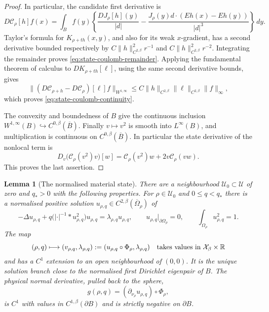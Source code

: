 \documentclass[11pt,a4paper]{article}
\newtheorem{lemma}[theorem]{Lemma}
\theoremstyle{definition}
\theoremstyle{remark}
\begin{document}
\begin{proof}
In particular, the candidate first derivative is
\begin{equation}
 D\mathcal C_\rho[h]f(x)
  =\int_B f(y)\left\{
       \frac{DJ_\rho[h](y)}{|d|}
       -\frac{J_\rho(y)d\cdot(Eh(x)-Eh(y))}{|d|^3}
                    \right\}\,dy.
 \label{eq:state-coulomb-derivative}
\end{equation}
Taylor's formula for $K_{\rho+th}(x,y)$, and also for its weak
$x$-gradient, has a second derivative bounded respectively by
$C\|h\|_{C^{2,\beta}}^2r^{-1}$ and
$C\|h\|_{C^{2,\beta}}^2r^{-2}$.  Integrating the remainder proves
\eqref{eq:state-coulomb-remainder}.  Applying the fundamental theorem
of calculus to $DK_{\rho+th}[\ell]$, using the same second derivative
bounds, gives
\[
 \|(D\mathcal C_{\rho+h}-D\mathcal C_\rho)[\ell]f\|_{W^{1,\infty}}
 \leq C\|h\|_{C^{2,\beta}}\|\ell\|_{C^{2,\beta}}\|f\|_\infty,
\]
which proves \eqref{eq:state-coulomb-continuity}.

The convexity and boundedness of $B$ give the continuous inclusion
$W^{1,\infty}(B)\hookrightarrow C^{0,\beta}(\overline B)$.
Finally $v\mapsto v^2$ is smooth into $L^\infty(B)$, and multiplication
is continuous on $C^{0,\beta}(\overline B)$.  In particular the state
derivative of the nonlocal term is
\[
 D_v\big(\mathcal C_\rho(v^2)v\big)[w]
       =\mathcal C_\rho(v^2)w+2v\mathcal C_\rho(vw).
\]
This proves the last assertion.
\end{proof}

\begin{lemma}[The normalised material state]
\label{lem:state}
There are a neighbourhood $\mathcal U_0\subset\mathcal U$ of zero and
$q_*>0$ with the following properties.  For
$\rho\in\mathcal U_0$ and $0\leq q<q_*$ there is a normalised positive
solution $u_{\rho,q}\in C^{2,\beta}(\overline\Omega_\rho)$ of
\begin{equation}
 -\Delta u_{\rho,q}+q\big(|\cdot|^{-1}*u_{\rho,q}^2\big)u_{\rho,q}
       =\lambda_{\rho,q}u_{\rho,q},\qquad
 u_{\rho,q}|_{\partial\Omega_\rho}=0,
 \qquad \int_{\Omega_\rho}u_{\rho,q}^2=1.
 \label{eq:state-hartree-equation}
\end{equation}
The map
\[
 (\rho,q)\longmapsto
 (v_{\rho,q},\lambda_{\rho,q})
 :=(u_{\rho,q}\circ\Phi_\rho,\lambda_{\rho,q})
 \quad\hbox{takes values in }\mathcal X_\beta\times\mathbb R
\]
and has a $C^1$ extension to an open neighbourhood of $(0,0)$.
It is the unique solution branch close to the normalised first
Dirichlet eigenpair of $B$.  The physical normal derivative, pulled
back to the sphere,
\begin{equation}
 g(\rho,q)=
 (\partial_{\nu_\rho}u_{\rho,q})\circ\Phi_\rho,
 \label{eq:state-flux-definition}
\end{equation}
is $C^1$ with values in $C^{1,\beta}(\partial B)$ and is strictly
negative on $\partial B$.
\end{lemma}
\end{document}
